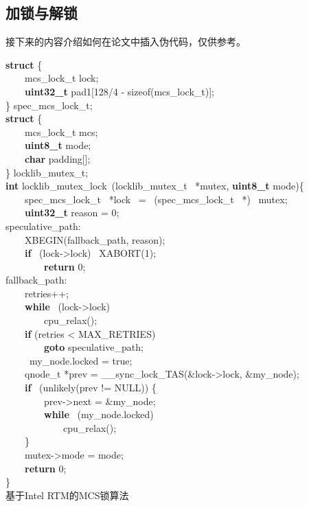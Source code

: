 \subsection{加锁与解锁}
接下来的内容介绍如何在论文中插入伪代码，仅供参考。
\begin{algorithm}[htbp]
\textbf{struct} \{\\
        ~~~~mcs\_lock\_t    lock;\\
        ~~~~\textbf{uint32\_t}    pad1[128/4 - sizeof(mcs\_lock\_t)];\\
\} spec\_mcs\_lock\_t;\\

\textbf{struct} \{\\
        ~~~~mcs\_lock\_t        mcs;\\
        ~~~~\textbf{uint8\_t} mode;\\
       ~~~~\textbf{char} padding[];\\
\} locklib\_mutex\_t;\\

\textbf{int} locklib\_mutex\_lock~(locklib\_mutex\_t ~*mutex, \textbf{uint8\_t} mode)\{\\
        ~~~~spec\_mcs\_lock\_t~ *lock ~= ~(spec\_mcs\_lock\_t ~*) ~mutex;\\
        ~~~~\textbf{uint32\_t} reason = 0;\\

speculative\_path:\\
        ~~~~XBEGIN(fallback\_path, reason);\\
        ~~~~\textbf{if}~ (lock->lock) ~XABORT(1); \\
        ~~~~~~~~\textbf{return} 0;\\

fallback\_path:\\
        ~~~~retries++;\\
        ~~~~\textbf{while}~ (lock->lock)\\
                ~~~~~~~~cpu\_relax();\\
        ~~~~\textbf{if} (retries < MAX\_RETRIES)\\
                ~~~~~~~~\textbf{goto} speculative\_path;\\

        \ 
        ~~~~my\_node.locked = true;\\
        ~~~~qnode\_t *prev = \_\_sync\_lock\_TAS(\&lock->lock, \&my\_node);\\
        ~~~~\textbf{if} ~(unlikely(prev != NULL)) \{\\
                ~~~~~~~~prev->next = \&my\_node;\\
                ~~~~~~~~\textbf{while}~ (my\_node.locked)\\
                        ~~~~~~~~~~~~cpu\_relax();\\
        ~~~~\}\\
        ~~~~mutex->mode = mode;\\
        ~~~~\textbf{return} 0; \\
\}\\
\caption{基于Intel RTM的MCS锁算法}
\label{algo:mcs_lock}
\end{algorithm}
